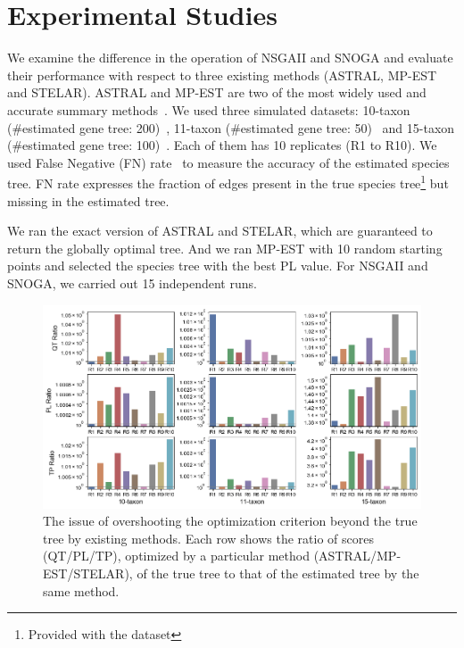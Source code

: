 \section{Experimental Studies}
\label{sec:experiment}
We examine the difference in the operation of NSGAII and SNOGA and evaluate their performance with respect to three existing methods (ASTRAL, MP-EST and STELAR). ASTRAL and MP-EST are two of the most widely used and accurate summary methods~\cite{islam2019stelar}. We used three simulated datasets: 10-taxon (\#estimated gene tree: 200)~\cite{bayzid2015weighted}, 11-taxon (\#estimated gene tree: 50)~\cite{chung2011comparing} and 15-taxon (\#estimated gene tree: 100)~\cite{statistical-binning}. Each of them has 10 replicates (R1 to R10). We used False Negative (FN) rate~\cite{bayzid2013naive} to measure the accuracy of the estimated species tree. FN rate expresses the fraction of edges present in the true species tree\footnote{Provided with the dataset} but missing in the estimated tree. %

We ran the exact version of ASTRAL and STELAR, which are guaranteed to return the globally optimal tree. And we ran MP-EST with 10 random starting points and selected the species tree with the best PL value. For NSGAII and SNOGA, we carried out 15 independent runs.  

\begin{figure}
	\begin{adjustwidth}{-4cm}{-3cm}
		\centering    
		\includegraphics[width=1.6\textwidth]{Figure/tool_ratio}
	\end{adjustwidth}
	\caption{The issue of overshooting the optimization criterion beyond the true tree by existing methods. Each row shows the ratio of scores (QT/PL/TP), optimized by a particular method (ASTRAL/MP-EST/STELAR), of the true tree to that of the estimated tree by the same method.} \label{fig:tool_ratio}
	
\end{figure}

